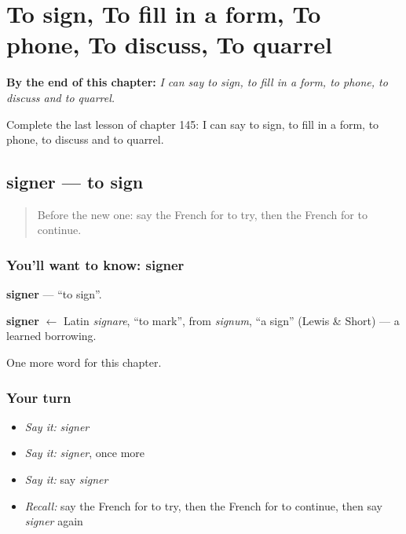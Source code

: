 
\chapter{To sign, To fill in a form, To phone, To discuss, To quarrel}
\label{ch:fr-to-sign-to-fill-in-a-form-to-phone-to-discuss-to-quarrel}

\begin{chapteropening}
\textbf{By the end of this chapter:} \emph{I can say to sign, to fill in a form, to phone, to discuss and to quarrel.}

Complete the last lesson of chapter 145: I can say to sign, to fill in a form, to phone, to discuss and to quarrel.
\end{chapteropening}

\section[signer]{signer — to sign}

\label{lesson:FR-C145-signer}



\begin{quote}
Before the new one: say the French for to try, then the French for to continue.
\end{quote}

\subsection*{You'll want to know: signer}
\textbf{signer} — \textquotedblleft{}to sign\textquotedblright{}.

\begin{cousinweb}
\textbf{signer} $\leftarrow$ Latin \emph{signare}, \textquotedblleft{}to mark\textquotedblright{}, from \emph{signum}, \textquotedblleft{}a sign\textquotedblright{} (Lewis \& Short) — a learned borrowing.
\end{cousinweb}

\begin{grammarlens}[title={What you've built}]
One more word for this chapter.
\end{grammarlens}

\subsection*{Your turn}
\begin{itemize}
\raggedright
  \item \emph{Say it:} \emph{signer}
  \item \emph{Say it:} \emph{signer}, once more
  \item \emph{Say it:} say \emph{signer}
  \item \emph{Recall:} say the French for to try, then the French for to continue, then say \emph{signer} again
\end{itemize}

